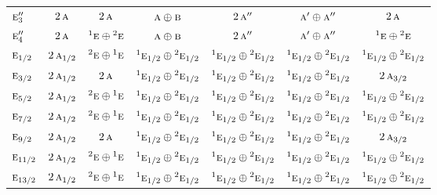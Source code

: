 \documentclass[10pt,a4paper]{article}
\numberwithin{equation}{section}
\newcommand{\irr}[1]{\text{\normalfont\scshape #1}}
\newcommand{\conjpair}[1]{{}^{#1}}
\begin{document}
{\begin{longtable}{@{}lcccccc@{}}
$\irr{e}_{3}''$ & $2\,\irr{a}$ & $2\,\irr{a}$ & $\irr{a}\oplus \irr{b}$ & $2\,\irr{a}''$ & $\irr{a}'\oplus \irr{a}''$ & $2\,\irr{a}$\\
$\irr{e}_{4}''$ & $2\,\irr{a}$ & $\conjpair{1}\irr{e}\oplus \conjpair{2}\irr{e}$ & $\irr{a}\oplus \irr{b}$ & $2\,\irr{a}''$ & $\irr{a}'\oplus \irr{a}''$ & $\conjpair{1}\irr{e}\oplus \conjpair{2}\irr{e}$\\
$\irr{e}_{1/2}$ & $2\,\irr{a}_{1/2}$ & $\conjpair{2}\irr{e}\oplus \conjpair{1}\irr{e}$ & $\conjpair{1}\irr{e}_{1/2}\oplus \conjpair{2}\irr{e}_{1/2}$ & $\conjpair{1}\irr{e}_{1/2}\oplus \conjpair{2}\irr{e}_{1/2}$ & $\conjpair{1}\irr{e}_{1/2}\oplus \conjpair{2}\irr{e}_{1/2}$ & $\conjpair{1}\irr{e}_{1/2}\oplus \conjpair{2}\irr{e}_{1/2}$\\
$\irr{e}_{3/2}$ & $2\,\irr{a}_{1/2}$ & $2\,\irr{a}$ & $\conjpair{1}\irr{e}_{1/2}\oplus \conjpair{2}\irr{e}_{1/2}$ & $\conjpair{1}\irr{e}_{1/2}\oplus \conjpair{2}\irr{e}_{1/2}$ & $\conjpair{1}\irr{e}_{1/2}\oplus \conjpair{2}\irr{e}_{1/2}$ & $2\,\irr{a}_{3/2}$\\
$\irr{e}_{5/2}$ & $2\,\irr{a}_{1/2}$ & $\conjpair{2}\irr{e}\oplus \conjpair{1}\irr{e}$ & $\conjpair{1}\irr{e}_{1/2}\oplus \conjpair{2}\irr{e}_{1/2}$ & $\conjpair{1}\irr{e}_{1/2}\oplus \conjpair{2}\irr{e}_{1/2}$ & $\conjpair{1}\irr{e}_{1/2}\oplus \conjpair{2}\irr{e}_{1/2}$ & $\conjpair{1}\irr{e}_{1/2}\oplus \conjpair{2}\irr{e}_{1/2}$\\
$\irr{e}_{7/2}$ & $2\,\irr{a}_{1/2}$ & $\conjpair{2}\irr{e}\oplus \conjpair{1}\irr{e}$ & $\conjpair{1}\irr{e}_{1/2}\oplus \conjpair{2}\irr{e}_{1/2}$ & $\conjpair{1}\irr{e}_{1/2}\oplus \conjpair{2}\irr{e}_{1/2}$ & $\conjpair{1}\irr{e}_{1/2}\oplus \conjpair{2}\irr{e}_{1/2}$ & $\conjpair{1}\irr{e}_{1/2}\oplus \conjpair{2}\irr{e}_{1/2}$\\
$\irr{e}_{9/2}$ & $2\,\irr{a}_{1/2}$ & $2\,\irr{a}$ & $\conjpair{1}\irr{e}_{1/2}\oplus \conjpair{2}\irr{e}_{1/2}$ & $\conjpair{1}\irr{e}_{1/2}\oplus \conjpair{2}\irr{e}_{1/2}$ & $\conjpair{1}\irr{e}_{1/2}\oplus \conjpair{2}\irr{e}_{1/2}$ & $2\,\irr{a}_{3/2}$\\
$\irr{e}_{11/2}$ & $2\,\irr{a}_{1/2}$ & $\conjpair{2}\irr{e}\oplus \conjpair{1}\irr{e}$ & $\conjpair{1}\irr{e}_{1/2}\oplus \conjpair{2}\irr{e}_{1/2}$ & $\conjpair{1}\irr{e}_{1/2}\oplus \conjpair{2}\irr{e}_{1/2}$ & $\conjpair{1}\irr{e}_{1/2}\oplus \conjpair{2}\irr{e}_{1/2}$ & $\conjpair{1}\irr{e}_{1/2}\oplus \conjpair{2}\irr{e}_{1/2}$\\
$\irr{e}_{13/2}$ & $2\,\irr{a}_{1/2}$ & $\conjpair{2}\irr{e}\oplus \conjpair{1}\irr{e}$ & $\conjpair{1}\irr{e}_{1/2}\oplus \conjpair{2}\irr{e}_{1/2}$ & $\conjpair{1}\irr{e}_{1/2}\oplus \conjpair{2}\irr{e}_{1/2}$ & $\conjpair{1}\irr{e}_{1/2}\oplus \conjpair{2}\irr{e}_{1/2}$ & $\conjpair{1}\irr{e}_{1/2}\oplus \conjpair{2}\irr{e}_{1/2}$\\

\end{longtable}}
\end{document}
